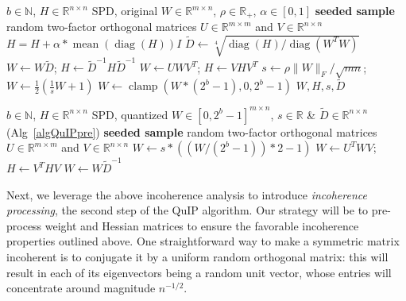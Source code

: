 \begin{algorithm}[t]
\caption{QuIP - Incoherence Pre-Processing}\label{algQuIPpre}
\begin{algorithmic}[1]
\Require $b \in \mathbb{N}$, $H \in \mathbb{R}^{n \times n}$ SPD, original $W \in \mathbb{R}^{m \times n}$, $\rho \in \mathbb{R}_+$, $\alpha \in [0,1]$
\State \textbf{seeded sample} random two-factor orthogonal matrices $U \in \mathbb{R}^{m \times m}$ and $V \in \mathbb{R}^{n \times n}$
\State $H = H + \alpha * \operatorname{mean}(\operatorname{diag}(H)) I$ 
\State $\tilde D \gets \sqrt[4]{ \operatorname{diag}(H) / \operatorname{diag}(W^T W) }$ 
\State $W \gets W \tilde D$; 
\;
$H \gets \tilde D^{-1} H \tilde D^{-1}$ 
\label{alg1rescale_a}
\State $W \gets U W V^T$;
\;
$H \gets V H V^T$
\label{alg1incoherent_a}
\State $s \gets \rho \|W\|_F / \sqrt{mn}$;
\;
$W \gets \frac 12 (\frac 1s W + 1)$
\label{alg1reducedquant}
\State $W \gets \operatorname{clamp}(W * (2^b-1), 0, 2^b-1)$ 
\State \Return $W, H, s, \tilde D$
\end{algorithmic}
\end{algorithm}

\begin{algorithm}[t]
\caption{QuIP - Incoherence Post-Processing}\label{algQuIPpost}
\begin{algorithmic}[1]
\Require $b \in \mathbb{N}$, $H \in \mathbb{R}^{n \times n}$ SPD, quantized $W \in [0, 2^b-1]^{m \times n}$, $s \in \mathbb{R}$ \& $\tilde D \in \mathbb{R}^{n \times n}$ (Alg~\ref{algQuIPpre})
\State \textbf{seeded sample} random two-factor orthogonal matrices $U \in \mathbb{R}^{m \times m}$ and $V \in \mathbb{R}^{n \times n}$
\State $W \gets s * \left( ( W / (2^b - 1) ) * 2 - 1 \right)$
\State $W \gets U^T W V$;
\;
$H \gets V^T H V$
\State \Return $W \gets W \tilde D^{-1}$ 
\end{algorithmic}
\end{algorithm}

Next, we leverage the above incoherence analysis to introduce \emph{incoherence processing}, the second step of the QuIP algorithm. Our strategy will be to pre-process weight and Hessian matrices to ensure the favorable incoherence properties outlined above. One straightforward way to make a symmetric matrix incoherent is to conjugate it by a uniform random orthogonal matrix: this will result in each of its eigenvectors being a random unit vector, whose entries will concentrate around magnitude $n^{-1/2}$. 

